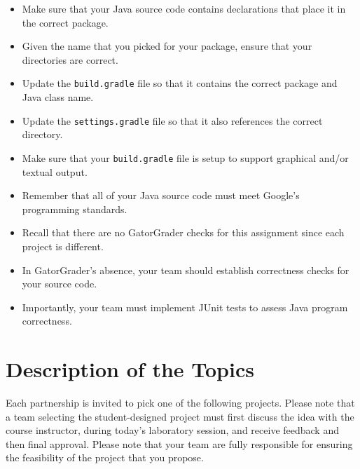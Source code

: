 \documentclass[11pt]{article}
\newcommand{\program}[1]{\lstinline{#1}}
\begin{document}
\begin{itemize}
  \setlength{\itemsep}{0in}
  \item Make sure that your Java source code contains declarations that place it in the correct package.
  \item Given the name that you picked for your package, ensure that your directories are correct.
  \item Update the \program{build.gradle} file so that it contains the correct package and Java class name.
  \item Update the \program{settings.gradle} file so that it also references the correct directory.
  \item Make sure that your \program{build.gradle} file is setup to support graphical and/or textual output.
  \item Remember that all of your Java source code must meet Google's programming standards.
  \item Recall that there are no GatorGrader checks for this assignment since each project is different.
  \item In GatorGrader's absence, your team should establish correctness checks for your source code.
  \item Importantly, your team must implement JUnit tests to assess
    Java program correctness.
\end{itemize}

\section*{Description of the Topics}

Each partnership is invited to pick one of the following projects. Please note
that a team selecting the student-designed project must first discuss the idea
with the course instructor, during today's laboratory session, and receive
feedback and then final approval. Please note that your team are fully
responsible for ensuring the feasibility of the project that you propose.

\end{document}
